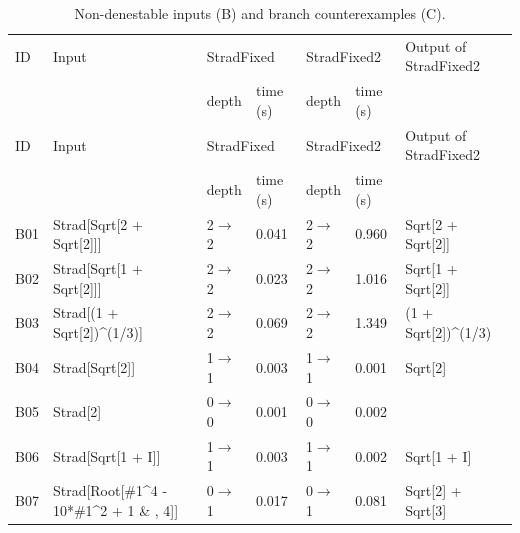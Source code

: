 \begin{longtable}{@{}p{}>{\ttfamily\footnotesize\raggedright\arraybackslash}p{}p{}p{}p{}p{}>{\ttfamily\footnotesize\raggedright\arraybackslash}p{}@{}}
\caption{Non-denestable inputs (B) and branch counterexamples (C).}\label{tab:cmpBC}\\
\toprule ID & Input & \multicolumn{2}{l}{StradFixed} & \multicolumn{2}{l}{StradFixed2} & Output of StradFixed2\\ & & depth & time (s) & depth & time (s) & \\\midrule\endfirsthead
\toprule ID & Input & \multicolumn{2}{l}{StradFixed} & \multicolumn{2}{l}{StradFixed2} & Output of StradFixed2\\ & & depth & time (s) & depth & time (s) & \\\midrule\endhead
\bottomrule\endfoot
B01 & Strad[\allowbreak{}Sqrt[\allowbreak{}2 +\allowbreak{} Sqrt[\allowbreak{}2]\allowbreak{}]\allowbreak{}]\allowbreak{} & 2$\to$2 & 0.041 & 2$\to$2 & 0.960 & Sqrt[\allowbreak{}2 +\allowbreak{} Sqrt[\allowbreak{}2]\allowbreak{}]\allowbreak{}\\
B02 & Strad[\allowbreak{}Sqrt[\allowbreak{}1 +\allowbreak{} Sqrt[\allowbreak{}2]\allowbreak{}]\allowbreak{}]\allowbreak{} & 2$\to$2 & 0.023 & 2$\to$2 & 1.016 & Sqrt[\allowbreak{}1 +\allowbreak{} Sqrt[\allowbreak{}2]\allowbreak{}]\allowbreak{}\\
B03 & Strad[\allowbreak{}(\allowbreak{}1 +\allowbreak{} Sqrt[\allowbreak{}2]\allowbreak{})\allowbreak{}\textasciicircum{}\allowbreak{}(\allowbreak{}1/\allowbreak{}3)\allowbreak{}]\allowbreak{} & 2$\to$2 & 0.069 & 2$\to$2 & 1.349 & (\allowbreak{}1 +\allowbreak{} Sqrt[\allowbreak{}2]\allowbreak{})\allowbreak{}\textasciicircum{}\allowbreak{}(\allowbreak{}1/\allowbreak{}3)\allowbreak{}\\
B04 & Strad[\allowbreak{}Sqrt[\allowbreak{}2]\allowbreak{}]\allowbreak{} & 1$\to$1 & 0.003 & 1$\to$1 & 0.001 & Sqrt[\allowbreak{}2]\allowbreak{}\\
B05 & Strad[\allowbreak{}2]\allowbreak{} & 0$\to$0 & 0.001 & 0$\to$0 & 0.002 & 2\\
B06 & Strad[\allowbreak{}Sqrt[\allowbreak{}1 +\allowbreak{} I]\allowbreak{}]\allowbreak{} & 1$\to$1 & 0.003 & 1$\to$1 & 0.002 & Sqrt[\allowbreak{}1 +\allowbreak{} I]\allowbreak{}\\
B07 & Strad[\allowbreak{}Root[\allowbreak{}\#1\textasciicircum{}\allowbreak{}4 -\allowbreak{} 10*\allowbreak{}\#1\textasciicircum{}\allowbreak{}2 +\allowbreak{} 1 \& ,\allowbreak{} 4]\allowbreak{}]\allowbreak{} & 0$\to$1 & 0.017 & 0$\to$1 & 0.081 & Sqrt[\allowbreak{}2]\allowbreak{} +\allowbreak{} Sqrt[\allowbreak{}3]\allowbreak{}\\

\end{longtable}
